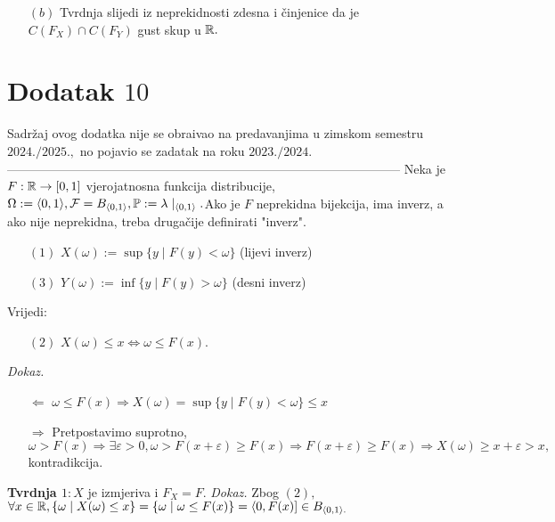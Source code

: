 \documentclass{article}
\begin{document}
\begin{enumerate}
\begin{enumerate}
    \end{enumerate}
    \item[\((b)\)] Tvrdnja slijedi iz neprekidnosti zdesna i činjenice da je \(C(F_X)\cap C(F_Y)\) gust skup u \(\Bbb R.\)
\end{enumerate}
\newpage
\section{Dodatak \(10\)}
Sadržaj ovog dodatka nije se obra\dj{}ivao na predavanjima u zimskom semestru \(2024./2025.,\) no pojavio se zadatak na roku \(2023./2024.\)\newline-----------------------------------------------------------------------------------------------\newline
Neka je \(F:\Bbb R\to[0,1]\) vjerojatnosna funkcija distribucije, \(\Omega:=\langle0,1\rangle,\mathcal F=B_{\langle0,1\rangle},\Bbb P:=\lambda\mid_{\langle0,1\rangle}.\)\newline Ako je \(F\) neprekidna bijekcija, ima inverz, a ako nije neprekidna, treba drugačije definirati "inverz".
\begin{enumerate}
    \item[\((1)\)] \(X(\omega):=\sup\{y\mid F(y)<\omega\}\) (lijevi inverz)
    \item[\((3)\)] \(Y(\omega):=\inf\{y\mid F(y)>\omega\}\) (desni inverz)
\end{enumerate}
Vrijedi:
\begin{enumerate}
    \item[\((2)\)] \(X(\omega)\le x\Leftrightarrow\omega\le F(x).\) 
\end{enumerate}
\textit{Dokaz.}
\begin{itemize}
    \item[\(\boxed{\Leftarrow}\)] \(\omega\le F(x)\Rightarrow X(\omega)=\sup\{y\mid F(y)<\omega\}\le x\)
    \item[\(\boxed{\Rightarrow}\)] Pretpostavimo suprotno, \(\omega>F(x)\Rightarrow\exists\varepsilon>0,\omega>F(x+\varepsilon)\ge F(x)\Rightarrow F(x+\varepsilon)\ge F(x)\Rightarrow X(\omega)\ge x+\varepsilon>x,\) kontradikcija.
\end{itemize}
\textbf{Tvrdnja \(1:\)}\newline \(X\) je izmjeriva i \(F_X=F.\)\newline\newline
\textit{Dokaz.}\newline
Zbog \((2),\) \(\forall x\in\Bbb R,\{\omega\mid X(\omega)\le x\}=\{\omega\mid \omega\le F(x)\}=\langle0,F(x)]\in B_{\langle 0,1\rangle.}\)\newline\newline
\end{document}
